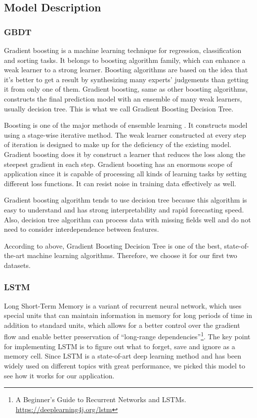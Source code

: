 \documentclass[letterpaper]{article} %
\begin{document}
\subsection{Model Description}

\subsubsection{GBDT}

Gradient boosting is a machine learning technique for regression, classification and sorting tasks. It belongs to boosting algorithm family, which can enhance a weak learner to a strong learner. Boosting algorithms are based on the idea that it's better to get a result by synthesizing many experts' judgements than getting it from only one of them. Gradient boosting, same as other boosting algorithms, constructs the final prediction model with an ensemble of many weak learners, usually decision tree. This is what we call Gradient Boosting Decision Tree.

Boosting is one of the major methods of ensemble learning \cite{li2016gentle}. It constructs model using a stage-wise iterative method. The weak learner constructed at every step of iteration is designed to make up for the deficiency of the existing model. Gradient boosting does it by construct a learner that reduces the loss along the steepest gradient in each step. Gradient boosting has an enormous scope of application since it is capable of processing all kinds of learning tasks by setting different loss functions. It can resist noise in training data effectively as well.

Gradient boosting algorithm tends to use decision tree because this algorithm is easy to understand and has strong interpretability and rapid forecasting speed. Also, decision tree algorithm can process data with missing fields well and do not need to consider interdependence between features.

According to above, Gradient Boosting Decision Tree is one of the best, state-of-the-art machine learning algorithms. Therefore, we choose it for our first two datasets.

\subsubsection{LSTM}

Long Short-Term Memory is a variant of recurrent neural network, which uses special units that can maintain information in memory for long periods of time in addition to standard units, which allows for a better control over the gradient flow and enable better preservation of ``long-range dependencies''\footnote{A Beginner's Guide to Recurrent Networks and LSTMs. \url{https://deeplearning4j.org/lstm}}. The key point for implementing LSTM is to figure out what to forget, save and ignore as a memory cell. Since LSTM is a state-of-art deep learning method and has been widely used on different topics with great performance, we picked this model to see how it works for our application.
\end{document}
